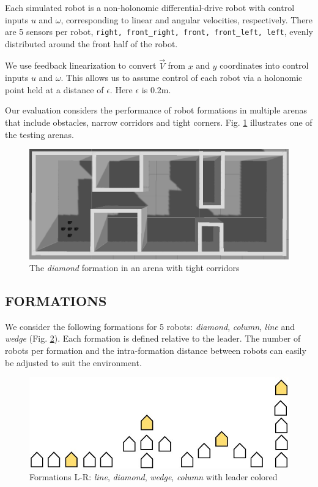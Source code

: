 \documentclass[letterpaper, 10 pt, conference]{ieeeconf}  %
\begin{document}
Each simulated robot is a non-holonomic differential-drive robot with control inputs $u$ and $\omega$, corresponding to linear and angular velocities, respectively. There are 5 sensors per robot, \texttt{right, front\_right, front, front\_left, left}, evenly distributed around the front half of the robot.

We use feedback linearization to convert $\vec{V}$ from $x$ and $y$ coordinates into control inputs $u$ and $\omega$. This allows us to assume control of each robot via a holonomic point held at a distance of $\epsilon$. Here $\epsilon$ is 0.2m.

Our evaluation considers the performance of robot formations in multiple arenas that include obstacles, narrow corridors and tight corners. Fig. \ref{corridorworld} illustrates one of the testing arenas.

\begin{figure}[thpb]
\centering
\includegraphics[width=\linewidth]{images/corridorworld.png}
\caption{The \textit{diamond} formation in an arena with tight corridors}
\label{corridorworld}
\end{figure}

\subsection{FORMATIONS}

We consider the following formations for 5 robots: \textit{diamond}, \textit{column}, \textit{line} and \textit{wedge} (Fig. \ref{formation_shapes}). Each formation is defined relative to the leader. The number of robots per formation and the intra-formation distance between robots can easily be adjusted to suit the environment.

\begin{figure}[thpb]
\centering
\includegraphics[width=0.7\linewidth]{images/formation_shapes.jpg}
\caption{Formations L-R: \textit{line}, \textit{diamond}, \textit{wedge}, \textit{column} with leader colored}
\label{formation_shapes}
\end{figure}
\end{document}
